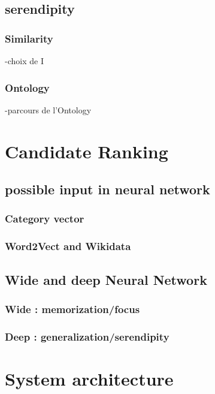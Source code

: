 \documentclass[11pt]{article}
\theoremstyle{plain}
\theoremstyle{definition}
\theoremstyle{remark}
\begin{document}
\newpage
\subsection{serendipity}

\subsubsection{Similarity}

-choix de I

\subsubsection{Ontology}

-parcours de l'Ontology

\section{Candidate Ranking}

\subsection{possible input in neural network}
\subsubsection{Category vector}
\subsubsection{Word2Vect and Wikidata}

\subsection{Wide and deep Neural Network}
\subsubsection{Wide : memorization/focus}
\subsubsection{Deep : generalization/serendipity}


\newpage

\section{System architecture}
\end{document}
